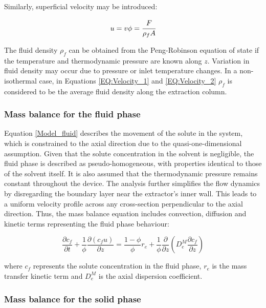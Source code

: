 \documentclass[a4paper,fleqn]{cas-dc}
\begin{document}
Similarly, superficial velocity may be introduced:

{\footnotesize
	\begin{equation} \label{EQ:Velocity_2}
		u = v \phi = \cfrac{F}{\rho_f A }
	\end{equation}
}

The fluid density $\rho_f$ can be obtained from the Peng-Robinson equation of state if the temperature and thermodynamic pressure are known along $z$. Variation in fluid density may occur due to pressure or inlet temperature changes. In a non-isothermal case, in Equations \ref{EQ:Velocity_1} and \ref{EQ:Velocity_2} $\rho_f$ is considered to be the average fluid density along the extraction column.

\subsubsection{Mass balance for the fluid phase} \label{CH: Mass_balance_fluid}

Equation \ref{Model_fluid} describes the movement of the solute in the system, which is constrained to the axial direction due to the quasi-one-dimensional assumption. Given that the solute concentration in the solvent is negligible, the fluid phase is described as pseudo-homogeneous, with properties identical to those of the solvent itself. It is also assumed that the thermodynamic pressure remains constant throughout the device. The analysis further simplifies the flow dynamics by disregarding the boundary layer near the extractor's inner wall. This leads to a uniform velocity profile across any cross-section perpendicular to the axial direction. Thus, the mass balance equation includes convection, diffusion and kinetic terms representing the fluid phase behaviour:

{\footnotesize
	\begin{equation}
		\label{Model_fluid}
		\frac{\partial c_f}{\partial t}
		+ \frac{1}{\phi} \frac{\partial \left( c_f u\right)}{\partial z}
		= \frac{1-\phi}{\phi} r_e
		+ \frac{1}{\phi} \frac{\partial}{\partial z} \left( D^M_e \frac{\partial c_f}{\partial z} \right)
	\end{equation}
}

where $c_f$ represents the solute concentration in the fluid phase, $r_e$ is the mass transfer kinetic term and $D^M_e$ is the axial dispersion coefficient.

\subsubsection{Mass balance for the solid phase} \label{Mass_balance_solid}
\end{document}
